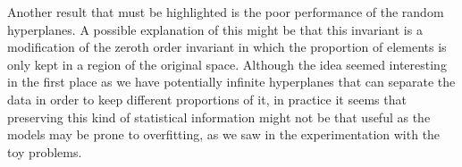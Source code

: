 Another result that must be highlighted is the poor performance of the random hyperplanes. A possible
explanation of this might be that this invariant is a modification of the zeroth order invariant in
which the proportion of elements is only kept in a region of the original space. Although the idea seemed
interesting in the first place as we have potentially infinite hyperplanes that can separate the data in order
to keep different proportions of it, in practice it seems that preserving this kind of statistical information
might not be that useful as the models may be prone to overfitting, as we saw in the experimentation with the toy
problems.


\begin{table}[h]
\centering
{}
\caption{Mean accuracy and standard deviation for each type of invariant in each problem considering the results for subsamples of 100\% of the training data. The results are expressed as percentages.}
\label{tab:results_accuracies_errors_100}
\end{table}

